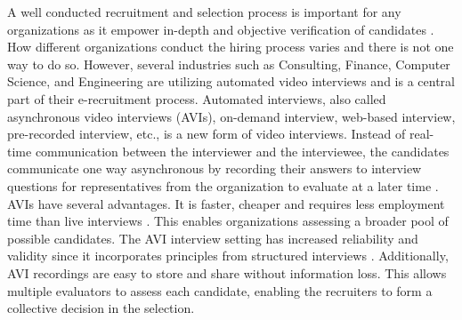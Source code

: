 A well conducted recruitment and selection process is important for any organizations as it empower in-depth and objective verification of candidates \cite{hiring-process-Sołek-BorowskaWilczewska+2018+25+33}. How different organizations conduct the hiring process varies and there is not one way to do so. However, several industries such as Consulting, Finance, Computer Science, and Engineering are utilizing automated video interviews and is a central part of their e-recruitment process. Automated interviews, also called asynchronous video interviews (AVIs), on-demand interview, web-based interview, pre-recorded interview, etc., is a new form of video interviews. Instead of real-time communication between the interviewer and the interviewee, the candidates communicate one way asynchronous by recording their answers to interview questions for representatives from the organization to evaluate at a later time \cite{video-interview1-LUKACIK2022100789}. AVIs have several advantages. It is faster, cheaper and requires less employment time than live interviews \cite{video_interview2-brenner2016asynchronous}. This enables organizations assessing a broader pool of possible candidates. The AVI interview setting has increased reliability and validity since it incorporates principles from structured interviews \cite{video-interview1-LUKACIK2022100789}. Additionally, AVI recordings are easy to store and share without information loss. This allows multiple evaluators to assess each candidate, enabling the recruiters to form a collective decision in the selection. \\

